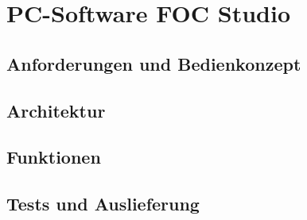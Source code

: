 \chapter{PC-Software FOC Studio}
\label{ch:focstudio}

\section{Anforderungen und Bedienkonzept}

\section{Architektur}

\section{Funktionen}

\section{Tests und Auslieferung}
